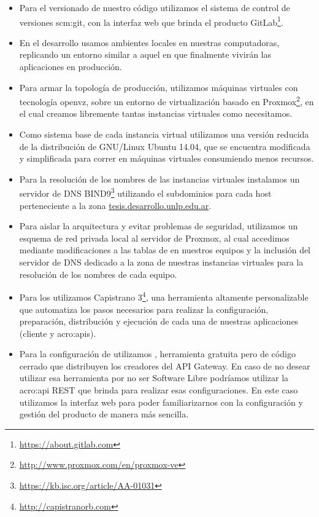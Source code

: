 \begin{itemize}
  \item Para el versionado de nuestro código utilizamos el sistema de control de versiones \gls{scm:git}, con la interfaz web que brinda el producto GitLab\footnote{\url{https://about.gitlab.com}}.

  \item En el desarrollo usamos ambientes locales en nuestras computadoras, replicando un entorno similar a aquel en que finalmente vivirán las aplicaciones en producción.

  \item Para armar la topología de producción, utilizamos máquinas virtuales con tecnología openvz, sobre un entorno de virtualización basado en Proxmox\footnote{\url{http://www.proxmox.com/en/proxmox-ve}}, en el cual creamos libremente tantas instancias virtuales como necesitamos.

  \item Como sistema base de cada instancia virtual utilizamos una versión reducida de la distribución de GNU/Linux Ubuntu 14.04, que se encuentra modificada y simplificada para correr en máquinas virtuales consumiendo menos recursos.

  \item Para la resolución de los nombres de las instancias virtuales instalamos un servidor de DNS BIND9\footnote{\url{https://kb.isc.org/article/AA-01031}} utilizando el subdominios para cada host perteneciente a la zona \url{tesis.desarrollo.unlp.edu.ar}.

  \item Para aislar la arquitectura y evitar problemas de seguridad, utilizamos un esquema de red privada local al servidor de Proxmox, al cual accedimos mediante modificaciones a las tablas de  en nuestros equipos y la inclusión del servidor de DNS dedicado a la zona de nuestras instancias virtuales para la resolución de los nombres de cada equipo.

  \item Para los  utilizamos Capistrano 3\footnote{\url{http://capistranorb.com}}, una herramienta altamente personalizable que automatiza los pasos necesarios para realizar la configuración, preparación, distribución y ejecución de cada una de nuestras aplicaciones (cliente y \glspl{acro:api}).

  \item Para la configuración de  utilizamos , herramienta gratuita pero de código cerrado que distribuyen los creadores del API Gateway. En caso de no desear utilizar esa herramienta por no ser Software Libre podríamos utilizar la \gls{acro:api} REST que  brinda para realizar esas configuraciones.  En este caso utilizamos la interfaz web para poder familiarizarnos con la configuración y gestión del producto de manera más sencilla.


\end{itemize}
